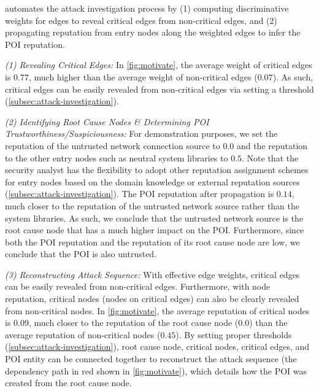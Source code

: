\tool automates the attack investigation process by (1) computing discriminative weights for edges to reveal critical edges from non-critical edges, and (2) propagating reputation from entry nodes along the weighted edges to infer the POI reputation.


\emph{(1) Revealing Critical Edges:}
In \cref{fig:motivate}, the average weight of critical edges is $0.77$, much higher than the average weight of non-critical edges (\ie $0.07$).
As such, critical edges can be easily revealed from non-critical edges via setting a threshold (\cref{subsec:attack-investigation}). 
%

\emph{(2) Identifying Root Cause Nodes \& Determining POI Trustworthiness/Suspiciousness:}
For demonstration purposes, we set the reputation of the untrusted network connection source to $0.0$ and the reputation to the other entry nodes such as neutral system libraries to $0.5$.
Note that the security analyst has the flexibility to adopt other reputation assignment schemes for entry nodes based on the domain knowledge or external reputation sources (\cref{subsec:attack-investigation}).
The POI reputation after propagation is $0.14$, much closer to the reputation of the untrusted network source rather than the system libraries.
As such, we conclude that the untrusted network source is the root cause node that has a much higher impact on the POI.
Furthermore, since both the POI reputation and the reputation of its root cause node are low, we conclude that the POI is also untrusted.

\emph{(3) Reconstructing Attack Sequence:}
With effective edge weights, critical edges can be easily revealed from non-critical edges.
Furthermore, with node reputation, critical nodes (\ie nodes on critical edges) can also be clearly revealed from non-critical nodes.
In \cref{fig:motivate}, the average reputation of critical nodes is $0.09$, much closer to the reputation of the root cause node ($0.0$) than the average reputation of non-critical nodes ($0.45$). 
By setting proper thresholds (\cref{subsec:attack-investigation}), root cause node, critical nodes, critical edges, and POI entity can be connected together to reconstruct the attack sequence (\ie the dependency path in red shown in \cref{fig:motivate}), which details how the POI was created from the root cause node.





